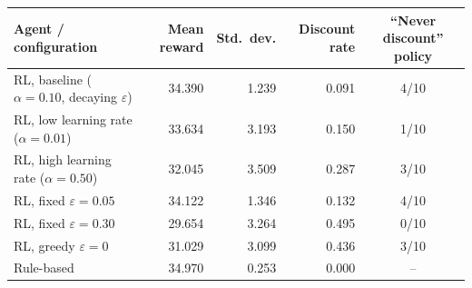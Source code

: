 \begin{tabular}{lrrrc}
\toprule
Agent / configuration & Mean reward & Std.\ dev. & Discount rate & ``Never discount'' policy \\
\midrule
RL, baseline ($\alpha=0.10$, decaying $\varepsilon$) & 34.390 & 1.239 & 0.091 & 4/10 \\
RL, low learning rate ($\alpha=0.01$) & 33.634 & 3.193 & 0.150 & 1/10 \\
RL, high learning rate ($\alpha=0.50$) & 32.045 & 3.509 & 0.287 & 3/10 \\
RL, fixed $\varepsilon=0.05$ & 34.122 & 1.346 & 0.132 & 4/10 \\
RL, fixed $\varepsilon=0.30$ & 29.654 & 3.264 & 0.495 & 0/10 \\
RL, greedy $\varepsilon=0$ & 31.029 & 3.099 & 0.436 & 3/10 \\
Rule-based & 34.970 & 0.253 & 0.000 & -- \\
\bottomrule
\end{tabular}
